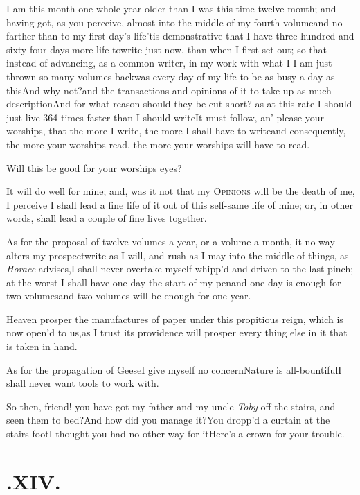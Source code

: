 \documentclass{article}
\begin{document}
I am this month one whole year older than I was this time twelve-month; and having
got, as you perceive, almost into the middle of my fourth volume\tsk and no farther
than to my first day’s life\tsk\break ’tis demonstrative that I have three hundred and
sixty-four days more life to\break write just now, than when I first set out;\break
so that instead of advancing, as a common writer, in my work with
what I
 I am just thrown so many volumes
back\break\tsk was every day of my
life to be as busy a day as this\tsk And why not?\tsk and the transactions and opinions
of it to take up as much description\tsk And for what reason should they be cut short?
as at this rate I should just live 364 times faster than I should write\tsk It must
follow, an’ please your worships, that the more I write, the more I shall have to
write\tsk and consequently, the more your worships read, the more your worships will
have to read.

Will this be good for your worships eyes?

It will do well for mine; and, was it not that my
\textsc{Opinions} will be the death of me, I perceive I shall
lead a fine life of it out of this self-same life of mine; or, in
other words, shall lead a couple of fine lives together.

As for the proposal of twelve volumes a year, or a volume a month, it no way alters my
prospect\tsk write as I will, and rush as I may into the middle
of things, as \textit{Horace} advises,\tsk I shall never overtake
myself whipp’d and driven to the last pinch; at the worst I
shall have one day the start of my pen\tsk and one day is enough
for two volumes\tsk and two volumes will be enough for one
year.\tsk

Heaven prosper the manufactures of paper under this propitious
reign, which is now open’d to us,\tsk as I trust its
pro\-vidence will prosper every thing else in it that is taken in
hand.\tsk{}

As for the propagation of Geese\tsk I give myself no
concern\tsk Nature is all-bountiful\tsk I shall never want
tools to work with.

\tsk So then, friend! you have got my father and my uncle
\textit{Toby} off the stairs, and seen them to bed?\tsh And
how did you manage it?\tsh You dropp’d a curtain at
the stairs foot\tsk I thought you had no other way for
it\tsh Here’s a crown for your trouble.

\smallskip
\section{.\enspace XIV.}
\end{document}
